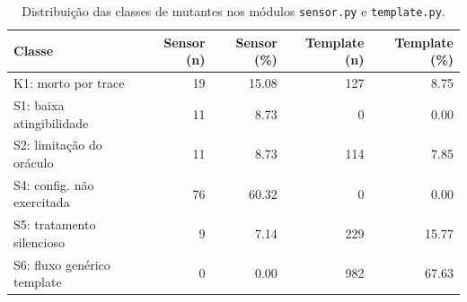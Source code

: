 \begin{table}[htbp]
\centering
\caption{Distribuição das classes de mutantes nos módulos \texttt{sensor.py} e \texttt{template.py}.}
\label{tab:classes_mutantes_resumo}
\begin{tabular}{lrrrr}
\hline
\textbf{Classe} & \textbf{Sensor (n)} & \textbf{Sensor (\%)} & \textbf{Template (n)} & \textbf{Template (\%)} \\
\hline
K1: morto por trace & 19 & 15.08 & 127 & 8.75 \\
S1: baixa atingibilidade & 11 & 8.73 & 0 & 0.00 \\
S2: limitação do oráculo & 11 & 8.73 & 114 & 7.85 \\
S4: config. não exercitada & 76 & 60.32 & 0 & 0.00 \\
S5: tratamento silencioso & 9 & 7.14 & 229 & 15.77 \\
S6: fluxo genérico template & 0 & 0.00 & 982 & 67.63 \\
\hline
\end{tabular}
\end{table}
